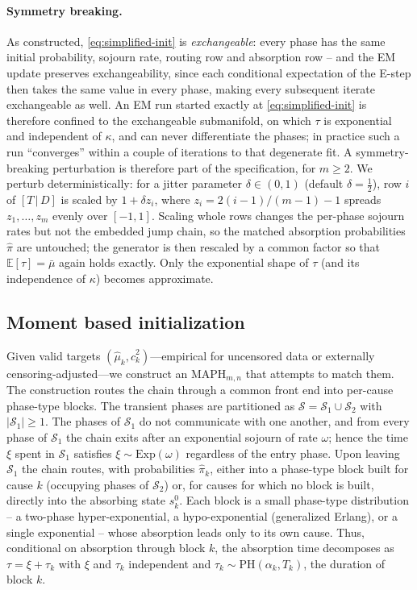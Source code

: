 \documentclass{article}
\newcommand{\ex}[1]{\mathbb{E}\left[#1\right]}
\newcommand{\cs}{\mathcal{S}}
\newenvironment{rcrevision}{}{}
\begin{document}
\paragraph{Symmetry breaking.} As constructed, \eqref{eq:simplified-init} is {\em exchangeable}: every phase has the same initial probability, sojourn rate, routing row and absorption row -- and the EM update preserves exchangeability, since each conditional expectation of the E-step then takes the same value in every phase, making every subsequent iterate exchangeable as well. An EM run started exactly at \eqref{eq:simplified-init} is therefore confined to the exchangeable submanifold, on which $\tau$ is exponential and independent of $\kappa$, and can never differentiate the phases; in practice such a run ``converges'' within a couple of iterations to that degenerate fit. A symmetry-breaking perturbation is therefore part of the specification, for $m \ge 2$. We perturb deterministically: for a jitter parameter $\delta \in (0,1)$ (default $\delta = \tfrac12$), row $i$ of $[T \,\vert\, D]$ is scaled by $1 + \delta z_i$, where $z_i = 2(i-1)/(m-1) - 1$ spreads $z_1,\ldots,z_m$ evenly over $[-1,1]$. Scaling whole rows changes the per-phase sojourn rates but not the embedded jump chain, so the matched absorption probabilities $\hat{\pi}$ are untouched; the generator is then rescaled by a common factor so that $\ex{\tau} = \bar{\mu}$ again holds exactly. Only the exponential shape of $\tau$ (and its independence of $\kappa$) becomes approximate.

\subsection{Moment based initialization}
\label{sec:init-moment}

\begin{rcrevision}
Given valid targets $(\hat\mu_k,\hat c_k^2)$---empirical for uncensored data or externally censoring-adjusted---we construct an $\text{MAPH}_{m,n}$ that attempts to match them. The construction routes the chain through a common front end into per-cause phase-type blocks. The transient phases are partitioned as $\cs = \cs_1 \cup \cs_2$ with $|\cs_1| \ge 1$. The phases of $\cs_1$ do not communicate with one another, and from every phase of $\cs_1$ the chain exits after an exponential sojourn of rate $\omega$; hence the time $\xi$ spent in $\cs_1$ satisfies $\xi \sim \mathrm{Exp}(\omega)$ regardless of the entry phase. Upon leaving $\cs_1$ the chain routes, with probabilities $\hat{\pi}_k$, either into a phase-type block built for cause $k$ (occupying phases of $\cs_2$) or, for causes for which no block is built, directly into the absorbing state $s^0_k$. Each block is a small phase-type distribution -- a two-phase hyper-exponential, a hypo-exponential (generalized Erlang), or a single exponential -- whose absorption leads only to its own cause. Thus, conditional on absorption through block $k$, the absorption time decomposes as $\tau = \xi + \tau_k$ with $\xi$ and $\tau_k$ independent and $\tau_k \sim \mathrm{PH}(\alpha_k, T_k)$, the duration of block $k$.
\end{rcrevision}
\end{document}
